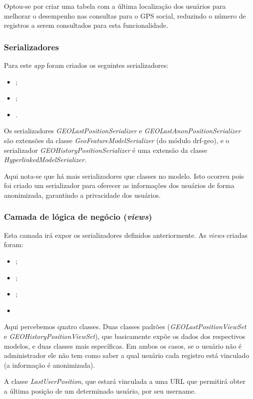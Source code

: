 Optou-se por criar uma tabela com a última localização dos usuários para melhorar o desempenho nas consultas para o GPS social, reduzindo o número de registros a serem consultados para esta funcionalidade.

\subsubsection{Serializadores}
Para este \textit{app} foram criados os seguintes serializadores: %
\begin{itemize}
    \item \textit{};
    \item \textit{};
    \item \textit{}.
\end{itemize}
Os serializadores \textit{GEOLastPositionSerializer} e \textit{GEOLastAnonPositionSerializer} são extensões da classe \mbox{\textit{GeoFeatureModelSerializer}} (do módulo \gls{drf}-geo), e o serializador \mbox{\textit{GEOHistoryPositionSerializer}} é uma extensão da classe \mbox{\textit{HyperlinkedModelSerializer}}.

Aqui nota-se que há mais serializadores que classes no modelo. Isto ocorreu pois foi criado um serializador para oferecer as informações dos usuários de forma anonimizada, garantindo a privacidade dos usuários.

\subsubsection{Camada de lógica de negócio (\textit{views})}
Esta camada irá expor os serializadores definidos anteriormente. As \textit{views} criadas foram: %
\begin{itemize}
    \item \textit{};
    \item \textit{};
    \item \textit{};
    \item \textit{}
\end{itemize}
Aqui percebemos quatro classes. Duas classes padrões (\mbox{\textit{GEOLastPositionViewSet}} e \mbox{\textit{GEOHistoryPositionViewSet}}), que basicamente expõe os dados dos respectivos modelos, e duas classes mais específicas. Em ambos os casos, se o usuário não é administrador ele não tem como saber a qual usuário cada registro está vinculado (a informação é anonimizada).

A classe \textit{LastUserPosition}, que estará vinculada a uma URL que permitirá obter a última posição de um determinado usuário, por seu username. 

